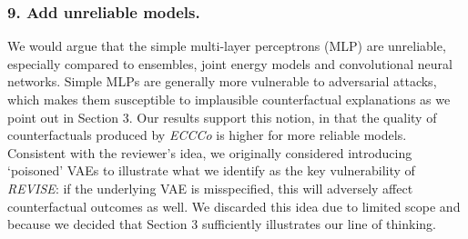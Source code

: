 \documentclass[letterpaper]{article} %
\begin{document}
\subsubsection{9. Add unreliable models.}

We would argue that the simple multi-layer perceptrons (MLP) are unreliable, especially compared to ensembles, joint energy models and convolutional neural networks. Simple MLPs are generally more vulnerable to adversarial attacks, which makes them susceptible to implausible counterfactual explanations as we point out in Section 3. Our results support this notion, in that the quality of counterfactuals produced by \textit{ECCCo} is higher for more reliable models. Consistent with the reviewer's idea, we originally considered introducing `poisoned' VAEs to illustrate what we identify as the key vulnerability of \textit{REVISE}: if the underlying VAE is misspecified, this will adversely affect counterfactual outcomes as well. We discarded this idea due to limited scope and because we decided that Section 3 sufficiently illustrates our line of thinking. 
\end{document}
